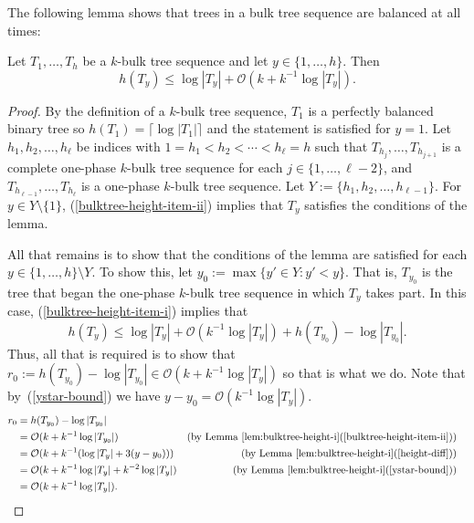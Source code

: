 \documentclass[kpfonts]{patmorin}
\newcommand{\Oh}{\mathcal{O}}
\let\le\leqslant
\begin{document}
The following lemma shows that trees in a bulk tree sequence are balanced at all times:

\begin{lem}
  Let $T_1,\dots,T_h$ be a $k$-bulk tree sequence and let $y\in\{1,\dots,h\}$.
  Then
\[
h(T_y)\le \log|T_y| + \Oh(k+k^{-1}\log|T_y|).
\]
\end{lem}

\begin{proof}
  By the definition of a $k$-bulk tree sequence, $T_1$ is a perfectly balanced binary tree so $h(T_1)=\lceil\log|T_1|\rceil$ and the statement is satisfied for $y=1$.
  Let $h_1,h_2,\dots,h_{\ell}$ be indices with $1 = h_1 < h_2 < \cdots < h_{\ell} = h$ such that $T_{h_j},\dots,T_{h_{j+1}}$ is a complete one-phase $k$-bulk tree sequence for each $j\in\{1,\dots,\ell-2\}$, and $T_{h_{\ell-1}},\dots,T_{h_{\ell}}$ is a one-phase $k$-bulk tree sequence.
  Let $Y := \{h_1,h_2,\dots,h_{\ell-1}\}$.
  For $y\in Y\setminus\{1\}$,
  (\ref{bulktree-height-item-ii}) implies that $T_y$ satisfies the conditions of the lemma.

  All that remains is to show that the conditions of the lemma are satisfied for each $y\in\{1,\dots,h\}\setminus Y$. To show this, let $y_0 := \max\{ y'\in Y: y'<y \}$.  That is, $T_{y_0}$ is the tree that began the one-phase $k$-bulk tree sequence in which $T_y$ takes part.
  In this case, (\ref{bulktree-height-item-i}) implies that
  \[  h(T_y) \le \log |T_y| + \Oh(k^{-1}\log |T_y|) + h(T_{y_0})-\log|T_{y_0}|.\]
  Thus, all that is required is to show that $r_0 := h(T_{y_0})-\log|T_{y_0}|\in \Oh(k+k^{-1}\log|T_y|)$ so that is what we do.
  Note that by~(\ref{ystar-bound})
  we have $y-y_0 = \Oh(k^{-1}\log|T_y|)$.
  \begin{align*}
    r_0 &= h(T_{y_0})-\log|T_{y_0}| \\
       &= \Oh(k + k^{-1}\log|T_{y_0}|)
        & \text{(by \lemref{bulktree-height-i}(\ref{bulktree-height-item-ii}))}\\
       &= \Oh(k + k^{-1}(\log|T_{y}| + 3(y-y_0)))
        & \text{(by \lemref{bulktree-height-i}(\ref{height-diff}))} \\
       &= \Oh(k + k^{-1}\log|T_{y}| + k^{-2}\log|T_{y}|) & \text{(by \lemref{bulktree-height-i}(\ref{ystar-bound}))} \\
       &= \Oh(k + k^{-1}\log|T_{y}|).  &  & \qedhere
  \end{align*}
\end{proof}
\end{document}
